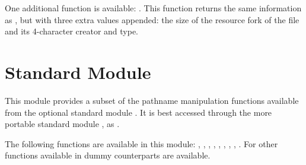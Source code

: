 One additional function is available: . This function
returns the same information as , but with three extra
values appended: the size of the resource fork of the file and its
4-character creator and type.


\section{Standard Module }



This module provides a subset of the pathname manipulation functions
available from the optional standard module .  It is
best accessed through the more portable standard module , as
.

The following functions are available in this module:
,
,
,
,
,
,
,
,
.
For other functions available in  dummy counterparts
are available.
